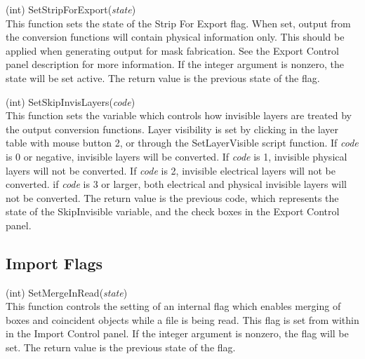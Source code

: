 \begin{description}
\item{(int) \vt SetStripForExport({\it state\/})}\\
This function sets the state of the {\cb Strip For Export} flag.  When
set, output from the conversion functions will contain physical
information only.  This should be applied when generating output for
mask fabrication.  See the {\cb Export Control} panel
description for more information.  If the integer argument is nonzero,
the state will be set active.  The return value is the previous state
of the flag.

\item{(int) \vt SetSkipInvisLayers({\it code\/})}\\
This function sets the variable which controls how invisible layers
are treated by the output conversion functions.  Layer visibility is
set by clicking in the layer table with mouse button 2, or through the
{\vt SetLayerVisible} script function.  If {\it code} is 0 or
negative, invisible layers will be converted.  If {\it code} is 1,
invisible physical layers will not be converted.  If {\it code} is 2,
invisible electrical layers will not be converted.  if {\it code} is 3
or larger, both electrical and physical invisible layers will not be
converted.  The return value is the previous code, which represents
the state of the {\et SkipInvisible} variable, and the check boxes in
the {\cb Export Control} panel.

\end{description}


\subsection{Import Flags}

\begin{description}
\item{(int) \vt SetMergeInRead({\it state\/})}\\
This function controls the setting of an internal flag which enables
merging of boxes and coincident objects while a file is being read. 
This flag is set from within {\Xic} in the {\cb Import Control}
panel.  If the integer argument is nonzero, the flag will be set.  The
return value is the previous state of the flag.

\end{description}


